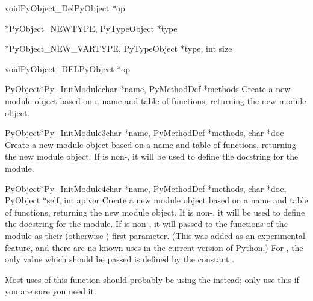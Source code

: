 \documentclass{manual}
\begin{document}
\begin{cfuncdesc}{void}{PyObject_Del}{PyObject *op}
\end{cfuncdesc}

\begin{cfuncdesc}{*}{PyObject_NEW}{TYPE, PyTypeObject *type}
\end{cfuncdesc}

\begin{cfuncdesc}{*}{PyObject_NEW_VAR}{TYPE, PyTypeObject *type,
                                                int size}
\end{cfuncdesc}

\begin{cfuncdesc}{void}{PyObject_DEL}{PyObject *op}
\end{cfuncdesc}

\begin{cfuncdesc}{PyObject*}{Py_InitModule}{char *name,
                                            PyMethodDef *methods}
  Create a new module object based on a name and table of functions,
  returning the new module object.
\end{cfuncdesc}

\begin{cfuncdesc}{PyObject*}{Py_InitModule3}{char *name,
                                             PyMethodDef *methods,
                                             char *doc}
  Create a new module object based on a name and table of functions,
  returning the new module object.  If  is non-\NULL, it will
  be used to define the docstring for the module.
\end{cfuncdesc}

\begin{cfuncdesc}{PyObject*}{Py_InitModule4}{char *name,
                                             PyMethodDef *methods,
                                             char *doc, PyObject *self,
                                             int apiver}
  Create a new module object based on a name and table of functions,
  returning the new module object.  If  is non-\NULL, it will
  be used to define the docstring for the module.  If  is
  non-\NULL, it will passed to the functions of the module as their
  (otherwise \NULL) first parameter.  (This was added as an
  experimental feature, and there are no known uses in the current
  version of Python.)  For , the only value which should
  be passed is defined by the constant .

    Most uses of this function should probably be using
  the  instead; only use this if you are
  sure you need it.
\end{cfuncdesc}
\end{document}
